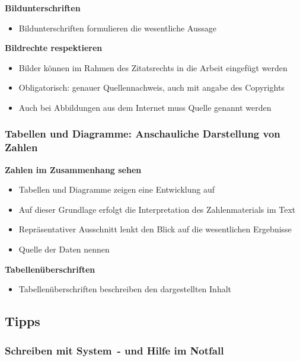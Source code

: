 \textbf{Bildunterschriften}

\begin{itemize}%
\item
  Bildunterschriften formulieren die wesentliche Aussage
\end{itemize}

\textbf{Bildrechte respektieren}

\begin{itemize}%
\item
  Bilder können im Rahmen des Zitatsrechts in die Arbeit eingefügt
  werden
\item
  Obligatorisch: genauer Quellennachweis, auch mit angabe des Copyrights
\item
  Auch bei Abbildungen aus dem Internet muss Quelle genannt werden
\end{itemize}

\subsubsection{Tabellen und Diagramme: Anschauliche Darstellung von
Zahlen}\label{tabellen-und-diagramme-anschauliche-darstellung-von-zahlen}

\textbf{Zahlen im Zusammenhang sehen}

\begin{itemize}%
\item
  Tabellen und Diagramme zeigen eine Entwicklung auf
\item
  Auf dieser Grundlage erfolgt die Interpretation des Zahlenmaterials im
  Text
\item
  Repräsentativer Ausschnitt lenkt den Blick auf die wesentlichen
  Ergebnisse
\item
  Quelle der Daten nennen
\end{itemize}

\textbf{Tabellenüberschriften}

\begin{itemize}%
\item
  Tabellenüberschriften beschreiben den dargestellten Inhalt
\end{itemize}

\subsection{Tipps}\label{tipps}

\subsubsection{\texorpdfstring{Schreiben mit \frqq System\flqq\, - und Hilfe im
Notfall}{Schreiben mit System - und Hilfe im Notfall}}\label{schreiben-mit-system-und-hilfe-im-notfall}

